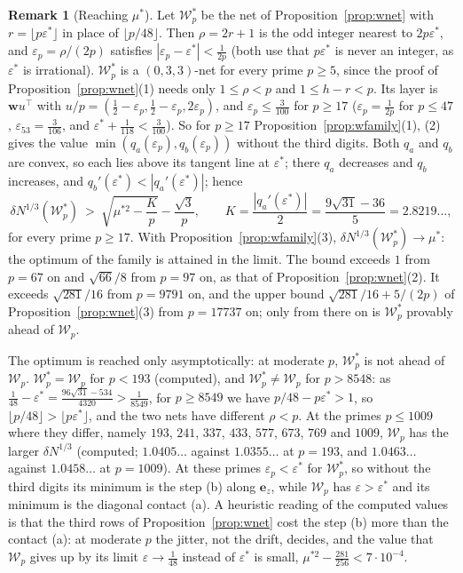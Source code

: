 \documentclass[11pt]{amsart}
\theoremstyle{definition}
\newtheorem{remark}[theorem]{Remark}
\theoremstyle{plain}
\newcommand{\e}{\mathbf{e}}
\begin{document}
\begin{remark}[Reaching $\mu^*$]\label{rem:wstar}
Let $\mathcal W^*_p$ be the net of Proposition~\ref{prop:wnet} with $r=\lfloor p\varepsilon^*\rfloor$ in place of $\lfloor p/48\rfloor$. Then $\rho=2r+1$ is the odd integer nearest to $2p\varepsilon^*$, and $\varepsilon_p=\rho/(2p)$ satisfies $|\varepsilon_p-\varepsilon^*|<\frac1{2p}$ (both use that $p\varepsilon^*$ is never an integer, as $\varepsilon^*$ is irrational). $\mathcal W^*_p$ is a $(0,3,3)$-net for every prime $p\ge5$, since the proof of Proposition~\ref{prop:wnet}(1) needs only $1\le\rho<p$ and $1\le h-r<p$. Its layer is $\mathbf w u^{\!\top}$ with $u/p=(\frac12-\varepsilon_p,\frac12-\varepsilon_p,2\varepsilon_p)$, and $\varepsilon_p\le\frac3{100}$ for $p\ge17$ ($\varepsilon_p=\frac1{2p}$ for $p\le47$, $\varepsilon_{53}=\frac3{106}$, and $\varepsilon^*+\frac1{118}<\frac3{100}$). So for $p\ge17$ Proposition~\ref{prop:wfamily}(1), (2) gives the value $\min(q_a(\varepsilon_p),q_b(\varepsilon_p))$ without the third digits. Both $q_a$ and $q_b$ are convex, so each lies above its tangent line at $\varepsilon^*$; there $q_a$ decreases and $q_b$ increases, and $q_b'(\varepsilon^*)<|q_a'(\varepsilon^*)|$; hence
\[
\delta N^{1/3}(\mathcal W^*_p)\ >\ \sqrt{\mu^{*2}-\frac Kp}-\frac{\sqrt3}p,\qquad K=\frac{|q_a'(\varepsilon^*)|}2=\frac{9\sqrt{31}-36}5=2.8219\ldots,
\]
for every prime $p\ge17$. With Proposition~\ref{prop:wfamily}(3), $\delta N^{1/3}(\mathcal W^*_p)\to\mu^*$: the optimum of the family is attained in the limit. The bound exceeds $1$ from $p=67$ on and $\sqrt{66}/8$ from $p=97$ on, as that of Proposition~\ref{prop:wnet}(2). It exceeds $\sqrt{281}/16$ from $p=9791$ on, and the upper bound $\sqrt{281}/16+5/(2p)$ of Proposition~\ref{prop:wnet}(3) from $p=17737$ on; only from there on is $\mathcal W^*_p$ provably ahead of $\mathcal W_p$.

The optimum is reached only asymptotically: at moderate $p$, $\mathcal W^*_p$ is not ahead of $\mathcal W_p$. $\mathcal W^*_p=\mathcal W_p$ for $p<193$ (computed), and $\mathcal W^*_p\ne\mathcal W_p$ for $p>8548$: as $\frac1{48}-\varepsilon^*=\frac{96\sqrt{31}-534}{4320}>\frac1{8549}$, for $p\ge8549$ we have $p/48-p\varepsilon^*>1$, so $\lfloor p/48\rfloor>\lfloor p\varepsilon^*\rfloor$, and the two nets have different $\rho<p$. At the primes $p\le1009$ where they differ, namely $193$, $241$, $337$, $433$, $577$, $673$, $769$ and $1009$, $\mathcal W_p$ has the larger $\delta N^{1/3}$ (computed; $1.0405\ldots$ against $1.0355\ldots$ at $p=193$, and $1.0463\ldots$ against $1.0458\ldots$ at $p=1009$). At these primes $\varepsilon_p<\varepsilon^*$ for $\mathcal W^*_p$, so without the third digits its minimum is the step (b) along $\e_z$, while $\mathcal W_p$ has $\varepsilon>\varepsilon^*$ and its minimum is the diagonal contact (a). A heuristic reading of the computed values is that the third rows of Proposition~\ref{prop:wnet} cost the step (b) more than the contact (a): at moderate $p$ the jitter, not the drift, decides, and the value that $\mathcal W_p$ gives up by its limit $\varepsilon\to\frac1{48}$ instead of $\varepsilon^*$ is small, $\mu^{*2}-\frac{281}{256}<7\cdot10^{-4}$.
\end{remark}
\end{document}
